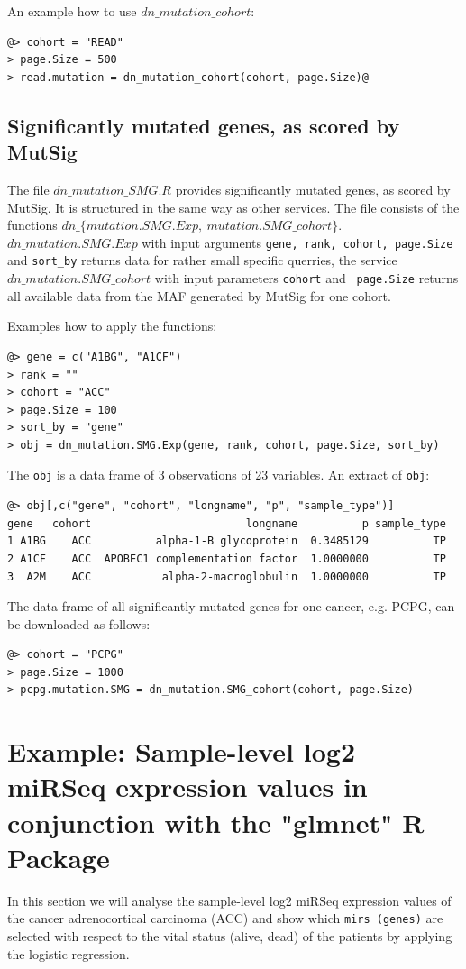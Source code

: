\documentclass{TechReport}
\begin{document}
An example how to use $dn\_mutation\_cohort$:
\begin{lstlisting}[style=base]
@> cohort = "READ"
> page.Size = 500
> read.mutation = dn_mutation_cohort(cohort, page.Size)@
\end{lstlisting}



\subsection{Significantly mutated genes, as scored by MutSig}
The file $dn\_mutation\_SMG.R$ provides significantly mutated genes,
as scored by MutSig. It is structured in the same way as other
services. The file consists of the functions $dn\_\{mutation.SMG.Exp,\ mutation.SMG\_cohort\}$. 
$dn\_mutation.SMG.Exp$ with
input arguments {\tt gene, rank, cohort, page.Size} and {\tt sort\_by}
returns data for rather small specific querries, the service
$dn\_mutation.SMG\_cohort$ with input parameters {\tt cohort} and {\tt
  page.Size} returns all available data from the MAF generated by
MutSig for one cohort.

Examples how to apply the functions:
\begin{lstlisting}[style=base]
@> gene = c("A1BG", "A1CF")
> rank = ""
> cohort = "ACC"
> page.Size = 100
> sort_by = "gene"
> obj = dn_mutation.SMG.Exp(gene, rank, cohort, page.Size, sort_by)
\end{lstlisting}
The {\tt obj} is a data frame of 3 observations of 23 variables. An extract of {\tt obj}:
\begin{lstlisting}[style=base]
@> obj[,c("gene", "cohort", "longname", "p", "sample_type")]
gene   cohort                        longname          p sample_type
1 A1BG    ACC          alpha-1-B glycoprotein  0.3485129          TP
2 A1CF    ACC  APOBEC1 complementation factor  1.0000000          TP
3  A2M    ACC           alpha-2-macroglobulin  1.0000000          TP
\end{lstlisting}
The data frame of all significantly mutated genes for one cancer, e.g. PCPG, 
can be downloaded as follows:
\begin{lstlisting}[style=base]
@> cohort = "PCPG"
> page.Size = 1000
> pcpg.mutation.SMG = dn_mutation.SMG_cohort(cohort, page.Size)
\end{lstlisting}




\section{Example: Sample-level log2 miRSeq expression values in conjunction with the
"glmnet" R Package}
In this section we will analyse the sample-level log2 miRSeq expression values of
the cancer adrenocortical carcinoma (ACC) and show which
{\tt mirs (genes)} are selected with respect to the vital status (alive, dead) of
the patients by applying the logistic 
regression.
\end{document}
